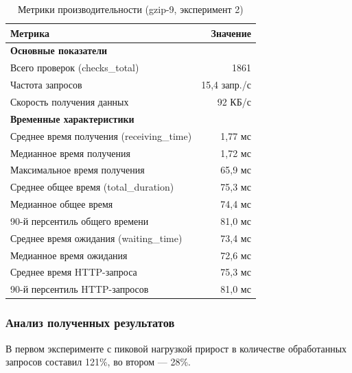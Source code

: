 \documentclass[12pt]{article}
\begin{document}
\begin{table}[h]
    \centering
    \caption{Метрики производительности (gzip-9, эксперимент 2)}
    \begin{tabular}{lr}
        \toprule
        \textbf{Метрика}                          & \textbf{Значение} \\
        \midrule
        \multicolumn{2}{l}{\textbf{Основные показатели}}              \\
        Всего проверок (checks\_total)            & 1861              \\
        Частота запросов                          & 15,4 запр./с      \\
        Скорость получения данных                 & 92 КБ/с           \\
        \hline
        \multicolumn{2}{l}{\textbf{Временные характеристики}}         \\
        Среднее время получения (receiving\_time) & 1,77 мс           \\
        Медианное время получения                 & 1,72 мс           \\
        Максимальное время получения              & 65,9 мс           \\
        Среднее общее время (total\_duration)     & 75,3 мс           \\
        Медианное общее время                     & 74,4 мс           \\
        90-й персентиль общего времени            & 81,0 мс           \\
        Среднее время ожидания (waiting\_time)    & 73,4 мс           \\
        Медианное время ожидания                  & 72,6 мс           \\
        Среднее время HTTP-запроса                & 75,3 мс           \\
        90-й персентиль HTTP-запросов             & 81,0 мс           \\
        \bottomrule
    \end{tabular}
\end{table}

\subsubsection{Анализ полученных результатов}

В первом эксперименте с пиковой нагрузкой прирост в количестве обработанных запросов составил 121\%, во втором — 28\%.
\end{document}
